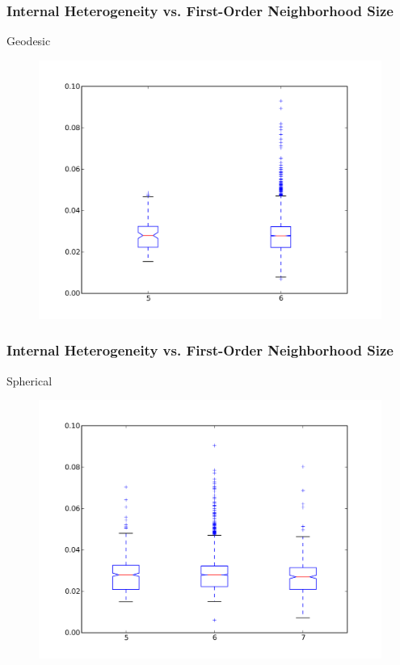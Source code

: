 \documentclass[nototal,handout]{beamer}
\begin{document}
\begin{frame}
	\frametitle{Internal Heterogeneity vs. First-Order Neighborhood Size}
 
\begin{block}{Geodesic}
  \begin{center}
  \begin{figure}
  \includegraphics[width=0.75\linewidth]{geodesic_iv_box.png}
  \end{figure}
  \end{center}
 \end{block} \end{frame} 

\begin{frame}
	\frametitle{Internal Heterogeneity vs. First-Order Neighborhood Size}
 
\begin{block}{Spherical}
  \begin{center}
  \begin{figure}
  \includegraphics[width=0.75\linewidth]{graph_iv_box.png}
  \end{figure}
  \end{center}
 \end{block} \end{frame} 
\end{document}
